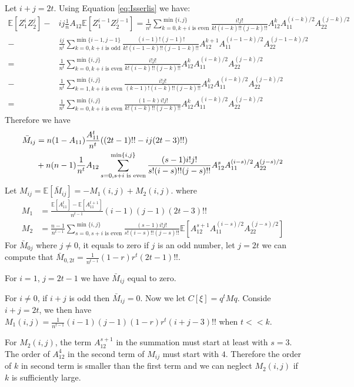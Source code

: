 \documentclass{article}
\def\E{\mathbb{E}}
\begin{document}
Let $i+j=2t$. Using Equation \eqref{eq:Isserlis} we have:
\begin{align*}
\E[Z_1^i Z_2^j]  -  & ij \frac{1}{n}A_{12}\E[Z_1^{i-1}Z_2^{j-1}] =
\frac{1}{n^t} \sum_{k=0, k+i \textrm{ is even}}^{\min\{i,j\}}
\frac{i! j!}{k! (i-k)!!(j-k)!!}
A_{12}^k A_{11}^{(i-k)/2}A_{22}^{(j-k)/2} \\
- & \frac{ij}{n^t} \sum_{k=0, k+i \textrm{ is odd}}^{\min\{i-1,j-1\}}
\frac{(i-1)! (j-1)!}{k! (i-1-k)!!(j-1-k)!!}
A_{12}^{k+1} A_{11}^{(i-1-k)/2}A_{22}^{(j-1-k)/2} \\
= &\frac{1}{n^t} \sum_{k=0, k+i \textrm{ is even}}^{\min\{i,j\}}
\frac{i! j!}{k! (i-k)!!(j-k)!!}
A_{12}^k A_{11}^{(i-k)/2}A_{22}^{(j-k)/2} \\
- & \frac{1}{n^t} \sum_{k=1, k+i \textrm{ is even}}^{\min\{i,j\}}
\frac{i! j!}{(k-1)! (i-k)!!(j-k)!!}
A_{12}^{k} A_{11}^{(i-k)/2}A_{22}^{(j-k)/2} \\
= &\frac{1}{n^t} \sum_{k=0, k+i \textrm{ is even}}^{\min\{i,j\}}
\frac{(1-k)i! j!}{k! (i-k)!!(j-k)!!}A_{12}^k A_{11}^{(i-k)/2}A_{22}^{(j-k)/2}
\end{align*}
Therefore we have
\begin{align}
\bar{M}_{ij} &= n(1-A_{11})\frac{A^t_{11}}{n^t}  ((2t-1)!!- ij (2t-3)!!)
\notag\\
&+n(n-1)\frac{1}{n^t}A_{12} \sum_{s=0, s+i \textrm{ is even}}^{\min\{i,j\}}
\frac{(s-1)i!j!}{s!(i-s)!!(j-s)!!}
A_{12}^s A_{11}^{(i - s) /2}A_{22}^{(j - s)/2} \label{eq:Mij_second}
\end{align}
Let $M_{ij} = \E[\bar{M}_{ij}] = -M_1(i,j) + M_2(i,j)$.
where
\begin{align}
M_1 & = \frac{\E[A^t_{11}] - \E[A^{t+1}_{11}]}{n^{t-1}}
(i-1)(j-1)(2t-3)!!  \\
M_2 & = \frac{n-1}{n^{t-1}} \sum_{s=0, s+i \textrm{ is even}}^{\min\{i,j\}}
\frac{(s-1)i!j!}{s!(i-s)!!(j-s)!!}
\E[A_{12}^{s+1} A_{11}^{(i - s) /2}A_{22}^{(j - s)/2} ]
\end{align}
For $\bar{M}_{0j}$ where $j \neq 0$,
it equals to zero if $j$ is an odd number,
let $j=2t$ we can compute that
$\bar{M}_{0,2t}=\frac{1}{n^{t-1}} (1-r)r^t (2t-1)!! $.

For $i = 1$, $ j = 2 t - 1$ we have
$\bar{M}_{ij}$ equal to zero.

For $i \neq 0$, if $i+j$ is odd then $\bar{M}_{ij} = 0$. Now we let
$C[\xi]=q^t M q$.
Conside $i+j = 2t$, we then have
$M_1(i,j) =
\frac{1}{n^{t-1}}(i-1)(j-1) (1-r)r^t (i+j-3)!!$ when $ t << k$.

For $M_2(i,j)$, the term $A_{12}^{s+1}$ in the summation
must start at least with $s=3$.
The order of $A_{12}^4$ in
the second term of $M_{ij}$ must start with $4$.
Therefore the order of $k$ in second term is smaller than
the first term and we can neglect $M_2(i,j)$
if $k$ is sufficiently large.
\end{document}
